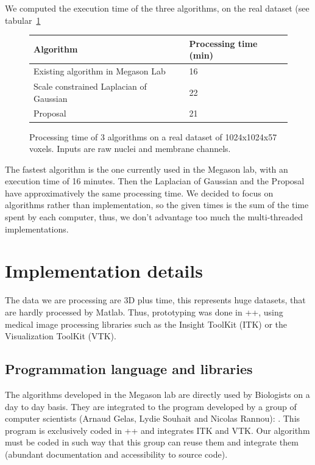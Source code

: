 We computed the execution time of the three algorithms, on the real dataset (see tabular~\ref{tab:timeEval}
\begin{figure}[htb]
\begin{center}
\begin{tabular}{|l|l|}
\hline Algorithm & Processing time (min) \\ 
\hline Existing algorithm in Megason Lab & 16 \\ 
\hline Scale constrained Laplacian of Gaussian &  22 \\ 
\hline Proposal & 21 \\
\hline
\end{tabular}
\end{center}
\caption{Processing time of 3 algorithms on a real dataset of 1024x1024x57 voxels. Inputs are raw nuclei and membrane channels.}
\label{tab:timeEval}
\end{figure}
The fastest algorithm is the one currently used in the Megason lab, with an execution time of 16 minutes.
Then the Laplacian of Gaussian and the Proposal have approximatively the same processing time.
We decided to focus on algorithms rather than implementation, so the given times is the sum of the time spent by each computer,
thus, we don't advantage too much the multi-threaded implementations.





\section{Implementation details}

The data we are processing are 3D plus time, this represents huge datasets, that are hardly processed by Matlab.
Thus, prototyping was done in {\C++}, using medical image processing libraries such as the Insight ToolKit (ITK)
or the Visualization ToolKit (VTK).

\subsection{Programmation language and libraries}

The algorithms developed in the Megason lab are directly used by Biologists on a day to day basis.
They are integrated to the program developed by a group of computer scientists (Arnaud Gelas, Lydie Souhait and Nicolas Rannou): {\gofigure}.
This program is exclusively coded in \C++ and integrates ITK and VTK.
Our algorithm must be coded in such way that this group can reuse them and integrate them (abundant documentation and accessibility to source code).

